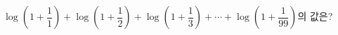 $\log\left(1+\dfrac{1}{1}\right)+\log\left(1+\dfrac{1}{2}\right)+\log\left(1+\dfrac{1}{3}\right)+\cdots+\log\left(1+\dfrac{1}{99}\right)$의 값은?
